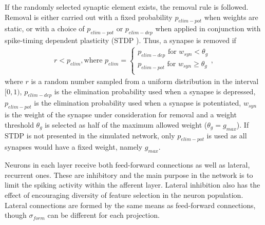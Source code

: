 \documentclass[preprint,12pt]{elsarticle}
\begin{document}
If the randomly selected synaptic element exists, the removal rule is followed.
Removal is either carried out with a fixed probability $p_{elim-pot}$ when weights are static, or with a choice of $p_{elim-pot}$  or $p_{elim-dep}$ when applied in conjunction with spike-timing dependent plasticity (STDP \cite{Song2000}). 
Thus, a synapse is removed if
%
\begin{equation} \label{eq:elimination_rule}
\begin{aligned}
r<p_{elim}, \text{where }  p_{elim} = 
    \begin{cases}
        p_{elim-dep} \text{ for }   w_{syn}  < \theta_g \\
        p_{elim-pot} \text{ for }   w_{syn}  \geq \theta_g \\
    \end{cases},
\end{aligned}
\end{equation}
%
where $r$ is a random number sampled from a uniform distribution in the interval $[0, 1)$, $p_{elim-dep}$ is the elimination probability used when a synapse is depressed, $p_{elim-pot}$ is the elimination probability used when a synapse is potentiated, $w_{syn}$ is the weight of the synapse under consideration for removal and a weight threshold $\theta_g$ is selected as half of the maximum allowed weight ($ \theta_g = g_{max}$). 
If STDP is not presented in the simulated network, only $p_{elim-pot}$ is used as all synapses would have a fixed weight, namely $g_{max}$.

Neurons in each layer receive both feed-forward connections as well as lateral, recurrent ones.
These are inhibitory and the main purpose in the network is to limit the spiking activity within the afferent layer. 
Lateral inhibition also has the effect of encouraging diversity of feature selection in the neuron population.
Lateral connections are formed by the same means as feed-forward connections, though $\sigma_{form}$ can be different for each projection.
\end{document}

